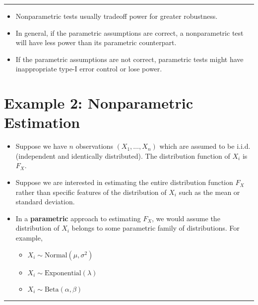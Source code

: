 \documentclass[]{book}
\providecommand{\tightlist}{%
  \setlength{\itemsep}{0pt}\setlength{\parskip}{0pt}}
\begin{document}
\begin{center}\rule{0.5\linewidth}{\linethickness}\end{center}

\begin{itemize}
\item
  Nonparametric tests usually tradeoff power for greater robustness.
\item
  In general, if the parametric assumptions are correct, a nonparametric test will have less power than its parametric counterpart.
\item
  If the parametric assumptions are not correct, parametric tests might have inappropriate type-I error control
  or lose power.
\end{itemize}

\hypertarget{sec:example-nonpar-estimation}{%
\section{Example 2: Nonparametric Estimation}\label{sec:example-nonpar-estimation}}

\begin{itemize}
\item
  Suppose we have \(n\) observations \((X_{1}, \ldots, X_{n})\) which are assumed to be i.i.d. (independent and identically distributed).
  The distribution function of \(X_{i}\) is \(F_{X}\).
\item
  Suppose we are interested in estimating the entire distribution function \(F_{X}\) rather than specific features
  of the distribution of \(X_{i}\) such as the mean or standard deviation.
\item
  In a \textbf{parametric} approach to estimating \(F_{X}\), we would assume the distribution of \(X_{i}\) belongs to some parametric family of distributions.
  For example,

  \begin{itemize}
  \tightlist
  \item
    \(X_{i} \sim \textrm{Normal}(\mu, \sigma^{2})\)
  \item
    \(X_{i} \sim \textrm{Exponential}(\lambda)\)
  \item
    \(X_{i} \sim \textrm{Beta}(\alpha, \beta)\)
  \end{itemize}
\end{itemize}

\begin{center}\rule{0.5\linewidth}{\linethickness}\end{center}
\end{document}
